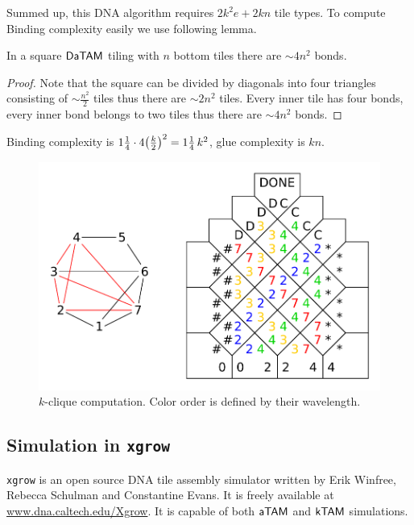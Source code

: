 Summed up, this DNA algorithm requires $2 k^2 e + 2 kn$ tile types. To compute Binding complexity easily we use following lemma.

\begin{lemma}
	In a square $\mathsf{DaTAM}$ tiling with $n$ bottom tiles there are $\sim 4 n^2$ bonds.
\end{lemma}
\begin{proof}
	Note that the square can be divided by diagonals into four triangles consisting of $\sim \frac{n^2}{2}$ tiles thus there are $\sim 2n^2$ tiles. Every inner tile has four bonds, every inner bond belongs to two tiles thus there are $\sim 4n^2$ bonds.
\end{proof}

Binding complexity is $1\nicefrac{1}{4} \cdot 4 \bigl(\frac{k}{2}\bigr)^2 = 1\nicefrac{1}{4}\,k^2$, glue complexity is $kn$.

\begin{figure}[H]
\begin{center}
	\includegraphics[scale=0.75]{./figures/k-clique/k-clique.pdf}
	\caption{$k$-clique computation. Color order is defined by their wavelength.}
	\label{fig:k-clique}
\end{center}
\end{figure}

\subsection{Simulation in {\tt xgrow}}

{\tt xgrow} is an open source DNA tile assembly simulator written by Erik Winfree, Rebecca Schulman and Constantine Evans. It is freely available at \url{www.dna.caltech.edu/Xgrow}. It is capable of both $\mathsf{aTAM}$ and $\mathsf{kTAM}$ simulations.

